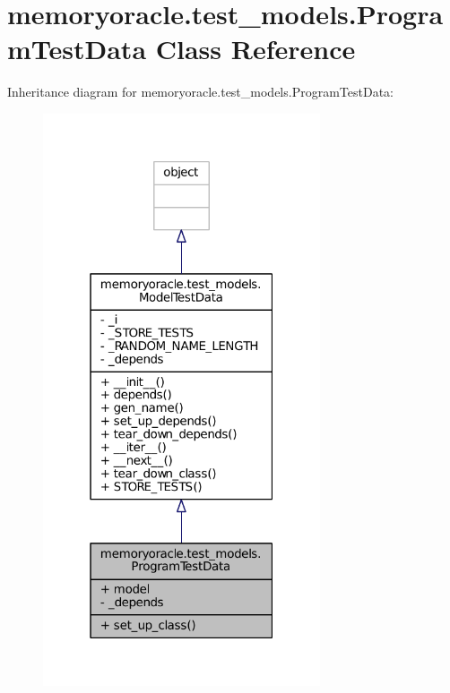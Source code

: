 \hypertarget{classmemoryoracle_1_1test__models_1_1ProgramTestData}{}\section{memoryoracle.\+test\+\_\+models.\+Program\+Test\+Data Class Reference}
\label{classmemoryoracle_1_1test__models_1_1ProgramTestData}


Inheritance diagram for memoryoracle.\+test\+\_\+models.\+Program\+Test\+Data\+:\nopagebreak
\begin{figure}[H]
\begin{center}
\leavevmode
\includegraphics[width=232pt]{classmemoryoracle_1_1test__models_1_1ProgramTestData__inherit__graph}
\end{center}
\end{figure}



